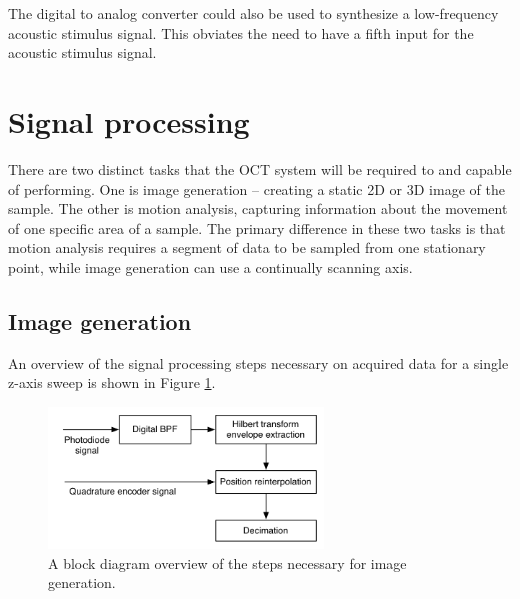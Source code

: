 The digital to analog converter could also be used to synthesize a low-frequency acoustic stimulus signal. This obviates the need to have a fifth input for the acoustic stimulus signal.


\section{Signal processing}
\label{sec:sig_proc}

There are two distinct tasks that the OCT system will be required to and capable of performing. One is image generation -- creating a static 2D or 3D image of the sample. The other is motion analysis, capturing information about the movement of one specific area of a sample. The primary difference in these two tasks is that motion analysis requires a segment of data to be sampled from one stationary point, while image generation can use a continually scanning axis.


\subsection{Image generation}

An overview of the signal processing steps necessary on acquired data for a single z-axis sweep is shown in Figure \ref{fig:imagegen}.

\begin{figure}[h!]
\centering
\includegraphics[width=0.65\textwidth]{Images/Background/image_analysis.png}
\caption{A block diagram overview of the steps necessary for image generation. \label{fig:imagegen}}
\end{figure}

